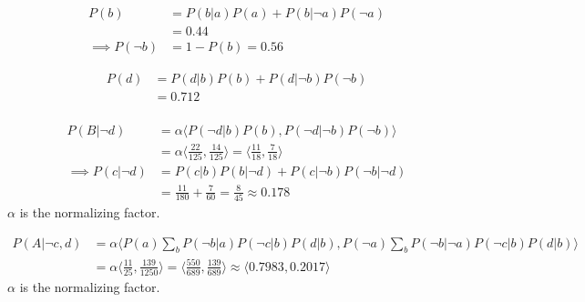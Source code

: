 \documentclass[10pt, a4paper, english]{../Template/NTNUoving}
\begin{document}
\begin{oppgave}

    \begin{punkt}
        \begin{align*}
            P(b) &=
            P(b|a)P(a)+P(b|\neg a)P(\neg a) \\
            &= 0.44 \\
            \implies P(\neg b) &= 1-P(b) = 0.56
        \end{align*}
    \end{punkt}

     \begin{punkt}
        \begin{align*}
            P(d) &=
            P(d|b)P(b)+P(d|\neg b)P(\neg b) \\
            &= 0.712 \\
        \end{align*}
     \end{punkt}

    \begin{punkt}
        \begin{align*}
            P(B | \neg d)
            &= \alpha \langle P(\neg d|b)P(b), P(\neg d | \neg b)P(\neg b) \rangle \\
            &= \alpha \langle \frac{22}{125}, \frac{14}{125} \rangle = \langle \frac{11}{18}, \frac{7}{18}\rangle \\
            \implies P(c|\neg d) &= P(c|b)P(b|\neg d) +  P(c|\neg b)P(\neg b|\neg d) \\
            &= \frac{11}{180} + \frac{7}{60} = \frac{8}{45} \approx 0.178
        \end{align*}
        $\alpha$ is the normalizing factor.
    \end{punkt}

     \begin{punkt}
        \begin{align*}
            P(A | \neg c, d)
            &= \alpha \langle P(a)\sum_b P(\neg b|a)P(\neg c |b) P(d|b), P(\neg a)\sum_b P(\neg b|\neg a)P(\neg c |b) P(d|b) \rangle \\
            &= \alpha \langle \frac{11}{25}, \frac{139}{1250} \rangle = \langle \frac{550}{689}, \frac{139}{689} \rangle \approx \langle 0.7983, 0.2017 \rangle
        \end{align*}
        $\alpha$ is the normalizing factor.
     \end{punkt}
\end{oppgave}

\begin{oppgave}

    \begin{punkt}
    \end{punkt}

    \begin{punkt}
    \end{punkt}

    \begin{punkt}
    \end{punkt}
\end{oppgave}
\end{document}
